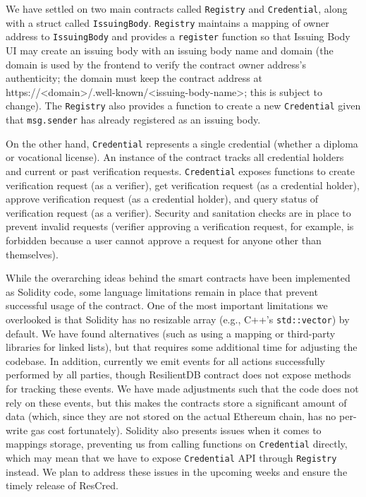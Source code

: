 We have settled on two main contracts called \verb|Registry| and \verb|Credential|, along with a
struct called \verb|IssuingBody|. \verb|Registry| maintains a mapping of owner address to
\verb|IssuingBody| and provides a \verb|register| function so that Issuing Body UI may create an
issuing body with an issuing body name and domain (the domain is used by the frontend to verify the
contract owner address’s authenticity; the domain must keep the contract address at
https://<domain>/.well-known/<issuing-body-name>; this is subject to change). The \verb|Registry|
also provides a function to create a new \verb|Credential| given that \verb|msg.sender| has already registered as an issuing body.

On the other hand, \verb|Credential| represents a single credential (whether a diploma or vocational license). An instance of the contract tracks all credential holders and current or past verification requests. \verb|Credential| exposes functions to create verification request (as a verifier), get verification request (as a credential holder), approve verification request (as a credential holder), and query status of verification request (as a verifier). Security and sanitation checks are in place to prevent invalid requests (verifier approving a verification request, for example, is forbidden because a user cannot approve a request for anyone other than themselves).

While the overarching ideas behind the smart contracts have been implemented as Solidity code, some
language limitations remain in place that prevent successful usage of the contract. One of the most
important limitations we overlooked is that Solidity has no resizable array (e.g., C++’s
\verb|std::vector|) by default. We have found alternatives (such as using a mapping or third-party
libraries for linked lists), but that requires some additional time for adjusting the codebase. In
addition, currently we emit events for all actions successfully performed by all parties, though
ResilientDB contract does not expose methods for tracking these events. We have made adjustments
such that the code does not rely on these events, but this makes the contracts store a significant
amount of data (which, since they are not stored on the actual Ethereum chain, has no per-write gas
cost fortunately). Solidity also presents issues when it comes to mappings storage, preventing us
from calling functions on \verb|Credential| directly, which may mean that we have to expose
\verb|Credential| API through \verb|Registry| instead. We plan to address these issues in the upcoming weeks and ensure the timely release of ResCred.

